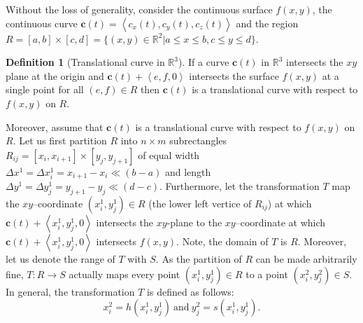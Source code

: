 \documentclass{article}
\theoremstyle{theorem}
\theoremstyle{definition}
\newtheorem*{definition}{Definition}
\begin{document}
\noindent
Without the loss of generality, consider the continuous surface $f(x,y)$, the continuous curve $\mathbf{c}(t)=\left <c_x(t),c_y(t), c_z(t) \right >$ and the region $R = [a,b]\times [c,d] = \{(x,y)\in \mathbb{R}^2|a \leq x \leq b, c \leq y \leq d\}$.

\begin{definition}[Translational curve in $\mathbb{R}^3$]
If a curve $\mathbf{c}(t)$ in $\mathbb{R}^3$ intersects the $xy$ plane at the origin and $\mathbf{c}(t) + \left < e,f,0 \right >$ intersects 
the surface $f(x,y)$ at a single point for all $(e,f)\in R$ then $\mathbf{c}(t)$ is a translational curve 
with respect to $f(x,y)$ on $R$. 
\end{definition}

\noindent
Moreover, assume that $\mathbf{c}(t)$ is a translational curve with respect to $f(x,y)$ on $R$. Let us first partition $R$ into $n\times m$ subrectangles $R_{ij} = [x_{i},x_{i+1}] \times [y_{j},y_{j+1}]$ of equal width $\Delta x^1 = \Delta x_i^1 = x_{i+1}-x_i\ll (b-a)$ and length $\Delta y^1= \Delta y_j^1 = y_{j+1}-y_j\ll(d-c)$.
Furthermore, let the transformation $T$ map the $xy$--coordinate $(x_i^1,y_j^1)\in R$ (the lower left vertice of $R_{ij}$) at which $\mathbf{c}(t) + \left <x_i^1,y_j^1,0 \right >$ intersects the 
$xy$-plane to the $xy$--coordinate at which $\mathbf{c}(t) + \left <x_i^1,y_j^1,0 \right >$ intersects $f(x,y)$. Note, the domain of $T$ is $R$. Moreover, let us denote the range 
of $T$ with $S$. As the partition of $R$ can be made arbitrarily fine, $T:R\rightarrow S$ actually maps every point $(x_i^1,y_j^1)\in R$ to a point $(x_i^2,y_j^2)\in S$. In general, the transformation $T$ is defined as follows:
\begin{equation}
x_i^2 = h(x_i^1,y_j^1)~\textrm{and}~y_j^2 = s(x_i^1,y_j^1).\nonumber
\end{equation}



\end{document}
